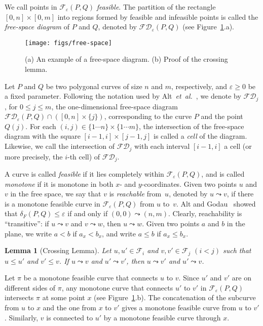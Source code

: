 \documentclass[12pt]{dalthesis}
\def\favoritefont{\bfseries \sffamily}
\def\QED{\ensuremath{{\Box}}}
\def\markatright#1{\leavevmode\unskip\nobreak\quad\hspace*{\fill}{#1}}
\newenvironment{proof}
	{\begin{trivlist}\item[\hskip\labelsep{\favoritefont Proof:}]}
	{\markatright{\QED}\end{trivlist}}
\newtheorem{lemma}[theorem]{Lemma}
\newcommand{\qed}{}
\newcommand{\lee}{\leqslant}
\newcommand{\gee}{\geqslant}
\newcommand{\set}[1]{{\{ #1 \}}}
\newcommand{\eps}{\varepsilon}
\newcommand{\etal}{{\em et~al.\/}}
\newcommand{\CF}{{\mathscr F}}
\newcommand{\distF}{\delta_F}
\newcommand{\Feps}{\CF_\eps}
\newcommand{\fs}{free-space }
\newcommand{\FD}{\mathscr {FD}}
\newcommand{\F}{\CF}
\newcommand{\reach}{\leadsto}
\begin{document}
We call points in $\Feps(P,Q)$ \emph{feasible}.
The partition of the rectangle $[0,n] \times [0,m]$ 
into regions formed by feasible and infeasible points
is called the \emph{\fs diagram} of $P$ and $Q$, denoted by $\FD_\eps(P,Q)$
(see Figure~\ref{fig:free-space}.a).


\begin{figure}[t]
	\centering
\texttt{[image: figs/free-space]}
	\caption{(a) An example of a \fs diagram.
	(b) Proof of the crossing lemma.}
	\label{fig:free-space}
	\vspace{-0.5em}	
\end{figure}

Let $P$ and $Q$ be two polygonal curves of size $n$ and $m$, respectively,
and $\eps \gee 0$ be a fixed parameter.
Following the notation used by Alt~\etal~\cite{AltERW03a},
we denote by $\FD_j$, for $0 \lee j \lee m$, 
the one-dimensional \fs diagram $\FD_\eps(P, Q) \cap ([0,n] \times \set{j})$,
corresponding to the curve $P$ and the point $Q(j)$. 
For each $(i,j) \in \set{1 \cdots n} \times \set{1 \cdots m}$,
the intersection of the free-space diagram with the square $[i-1,i] \times [j-1,j]$ 
is called a \emph{cell} of the diagram. Likewise, we call the intersection of $\FD_j$ with each interval $[i-1,i]$ a cell 
(or more precisely, the $i$-th cell) of $\FD_j$.

A curve is called \emph{feasible} if it lies completely within $\Feps(P,Q)$,
and is called {\em monotone} if it is monotone in both $x$- and $y$-coordinates.
Given two points $u$ and $v$ in the free space, we say that 
$v$ is \emph{reachable} from~$u$,
denoted by $u \reach v$,
if there is a monotone feasible curve in $\Feps(P,Q)$ from $u$ to~$v$.
Alt and Godau~\cite{AltG95} showed that $\distF(P,Q) \lee \eps$ 
if and only if $(0,0) \reach (n,m)$.
Clearly, reachability is ``transitive'':
if $u \reach v$ and $v \reach w$, then $u \reach w$.
Given two points $a$ and $b$ in the plane, 
we write $a < b$ if $a_x < b_x$,
and write $a \lee b$ if $a_x \lee b_x$.

\begin{lemma}[Crossing Lemma] \label{lemma:cross}
	Let $u,u' \in \F_i$ and $v,v' \in \F_j$ $(i < j)$ such that $u \lee u'$ and $v' \lee v$.
	If $u \reach v$ and $u' \reach v'$, then $u \reach v'$ and $u' \reach v$.
\end{lemma}

\begin{proof}
	Let $\pi$ be a monotone feasible curve that connects $u$ to $v$. 
	Since $u'$ and $v'$ are on different sides of $\pi$,
	any monotone curve that connects $u'$ to $v'$ in $\Feps(P,Q)$
	intersects $\pi$ at some point $x$ (see Figure~\ref{fig:free-space}.b).
	The concatenation of the subcurve from $u$ to $x$ 
	and the one from $x$ to $v'$ gives a monotone feasible curve from 
	$u$ to $v'$. Similarly, $v$ is connected to $u'$ by a monotone feasible curve through $x$.
	\qed
\end{proof}
\end{document}
